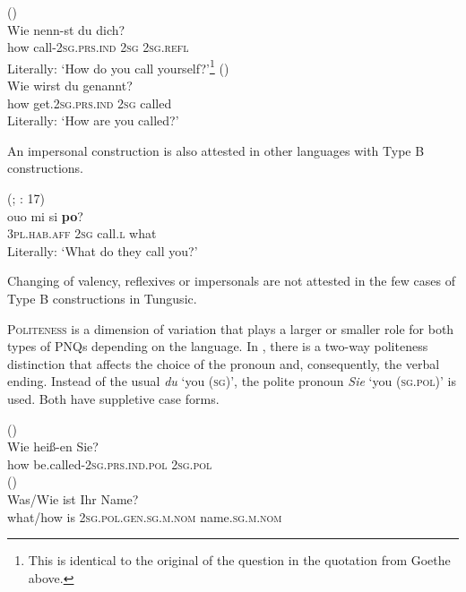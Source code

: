 \documentclass[output=paper,colorlinks,citecolor=brown]{langscibook}
\begin{document}
\ea
    \label{example4.43}
     ()\\
    \gll Wie		nenn-st			du		dich?\\
    how		call-2\textsc{sg.prs.ind}	2\textsc{sg}		2\textsc{sg.refl}\\
    \glt Literally: ‘How do you call yourself?’\footnote{This is identical to the original of the question in the quotation from Goethe above.}
\ex
    \label{example4.44}
     ()\\
    \gll Wie		wirst			du		genannt?\\
    how		get.2\textsc{sg.prs.ind}	2\textsc{sg}		called\\
    \glt Literally: ‘How are you called?’
\z

\noindent An impersonal construction is also attested in other languages with Type B constructions.

\ea
    \label{example4.45}
     (; \citealt{Paperno2014}: 17)\\
    \gll ouo				mi		si		\textbf{po}?\\
    3\textsc{pl.hab.aff}		2\textsc{sg}		call.\textsc{l}	what\\
    \glt Literally: ‘What do they call you?’
\z

\noindent Changing of valency, reflexives or impersonals are not attested in the few cases of Type B constructions in Tungusic.

\textsc{Politeness} is a dimension of variation that plays a larger or smaller role for both types of PNQs depending on the language. In , there is a two-way politeness distinction that affects the choice of the pronoun and, consequently, the verbal ending. Instead of the usual \textit{du} ‘you (\textsc{sg})’, the polite pronoun \textit{Sie} ‘you (\textsc{sg.pol})’ is used. Both have suppletive case forms.

\ea
    \label{example4.46}
     ()\\
    \gll Wie		heiß-en					Sie?\\
    how		be.called-2\textsc{sg.prs.ind.pol}	2\textsc{sg.pol}\\
\ex
    \label{example4.47}
     ()\\
    \gll Was/Wie	ist		Ihr					Name?\\
    what/how		is		2\textsc{sg.pol.gen.sg.m.nom}	name.\textsc{sg.m.nom}\\
\z
\end{document}
